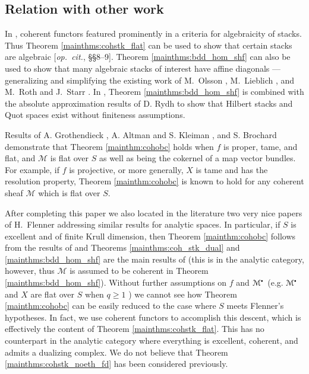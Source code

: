 \documentclass{amsart}
\theoremstyle{plain}
\theoremstyle{definition}
\theoremstyle{remark}
\numberwithin{equation}{section}
\newcommand{\opcit}[1][]{[\emph{op.\ cit.}{#1}]\xspace}
\newcommand{\shv}[1]{\mathcal{{#1}}}
\newcommand{\sbt}{\,\begin{picture}(-1,-1)(0,-2)\circle*{1.5}\end{picture}\ }
\newcommand{\cplx}[1]{\shv{{#1}}^{\sbt}}
\begin{document}
\subsection*{Relation with other work}
In \cite{hallj_openness_coh}, coherent functors featured prominently
in a criteria for algebraicity of stacks. Thus Theorem
\ref{mainthms:cohstk_flat} can be used to show that certain stacks are
algebraic \opcit[, \S\S8--9]. Theorem \ref{mainthms:bdd_hom_shf} can
also be used to show that many algebraic stacks of interest have affine
diagonals \cite[\S\S8-9]{hallj_openness_coh}---generalizing and
simplifying the existing work of M.~Olsson
\cite[Prop.~5.10]{MR2239345}, M.~Lieblich \cite[Prop.~2.3]{MR2233719},
and M.~Roth and J.~Starr \cite[Thm.~2.1]{2009arXiv0908.0096R}. In
\cite{hallj_dary_g_hilb_quot}, Theorem \ref{mainthms:bdd_hom_shf} is
combined with the absolute approximation results of D. Rydh
\cite{rydh-2009} to show that Hilbert stacks and Quot spaces exist
without finiteness assumptions.

Results of A. Grothendieck \cite[III.7.7.8-9]{EGA}, A. Altman and
S. Kleiman \cite[1.1]{MR555258}, and S. Brochard \cite[Prop.\
A.4.3]{MR2871149} demonstrate that Theorem \ref{mainthm:cohobc} holds
when $f$ is proper, tame, and flat, and $\shv{M}$
is flat over $S$ as well as being the cokernel of a map vector bundles. For
example, if $f$ is projective, or more generally, $X$ is tame and has
the resolution property, Theorem \ref{mainthm:cohobc} is known to hold
for any coherent sheaf $\shv{M}$ which is flat over $S$.

After completing this paper we also located in the literature two very nice
papers of H.~Flenner addressing similar results for analytic
spaces. In particular, if $S$ is excellent and of finite Krull
dimension, then Theorem \ref{mainthm:cohobc} follows from the results
of \cite[\S7]{MR638811} and Theorems 
\ref{mainthms:coh_stk_dual} and \ref{mainthms:bdd_hom_shf} are the main results of \cite{MR641823}
(this is in the analytic category, however, thus $\shv{M}$ is
assumed to be coherent in Theorem \ref{mainthms:bdd_hom_shf}). Without
further assumptions on $f$ and $\cplx{M}$ (e.g. $\cplx{M}$ and $X$ are
flat over $S$ when $q\geq 1$ \cite[\S1]{MR555258}) we cannot see how
Theorem \ref{mainthm:cohobc} can be easily reduced to the case where
$S$ meets Flenner's hypotheses. In fact, we use coherent functors to
accomplish this descent, which is effectively the content of Theorem
\ref{mainthms:cohstk_flat}. This has no counterpart in the analytic
category where everything is excellent, coherent, and admits a
dualizing complex. We do not believe that Theorem
\ref{mainthms:cohstk_noeth_fd} has been considered previously.
\end{document}
